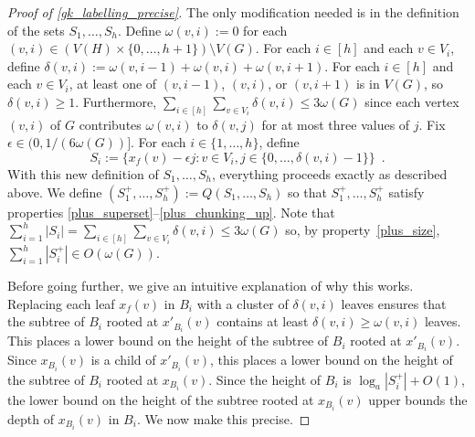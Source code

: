 \documentclass{patmorin}
\renewcommand{\ge}{\geqslant}
\renewcommand{\le}{\leqslant}
\newcommand{\Oh}{O}
\begin{document}
\begin{proof}[Proof of \cref{gk_labelling_precise}]
  The only modification needed is in the definition of the sets $S_1,\ldots,S_h$. Define $\omega(v,i):=0$ for each $(v,i)\in (V(H)\times\{0,\ldots,h+1\})\setminus V(G)$.  For each $i\in[h]$ and each $v\in V_i$, define $\delta(v,i) := \omega(v,i-1)+\omega(v,i)+\omega(v,i+1)$.  For each $i\in[h]$ and each $v\in V_i$, at least one of $(v,i-1)$, $(v,i)$, or $(v,i+1)$ is in $V(G)$, so $\delta(v,i) \ge 1$. Furthermore, $\sum_{i\in[h]}\sum_{v\in V_i}\delta(v,i) \le 3\omega(G)$ since each vertex $(v,i)$ of $G$ contributes $\omega(v,i)$ to $\delta(v,j)$ for at most three values of $j$. Fix $\epsilon \in (0,1/(6\omega(G))]$. For each $i\in\{1,\ldots,h\}$, define 
  \[
     S_i := \{ x_f(v)-\epsilon j: v\in V_i, j\in\{0,\ldots,\delta(v,i)-1\}\} \enspace .
  \]
  With this new definition of $S_1,\ldots,S_h$, everything proceeds exactly as described above. We define $(S^+_1,\ldots,S^+_h):= Q(S_1,\ldots,S_h)$ so that $S^+_1,\ldots,S^+_h$ satisfy properties \ref{plus_superset}--\ref{plus_chunking_up}. Note that $\sum_{i=1}^h |S_i| = \sum_{i\in[h]}\sum_{v\in V_i}\delta(v,i) \le 3\omega(G)$ so, by property~\ref{plus_size}, $\sum_{i=1}^h |S^+_i| \in \Oh(\omega(G))$.

  Before going further, we give an intuitive explanation of why this works.
  Replacing each leaf $x_f(v)$ in $B_i$ with a cluster of $\delta(v,i)$ leaves ensures that the subtree of $B_i$ rooted at $x'_{B_i}(v)$ contains at least $\delta(v,i)\ge \omega(v,i)$ leaves.  This places a lower bound on the height of the subtree of $B_i$ rooted at $x'_{B_i}(v)$.  Since $x_{B_i}(v)$ is a child of $x'_{B_i}(v)$, this places a lower bound on the height of the subtree of $B_i$ rooted at $x_{B_i}(v)$.  Since the height of $B_i$ is $\log_a |S^+_i| + \Oh(1)$, the lower bound on the height of the subtree rooted at $x_{B_i}(v)$ upper bounds the depth of $x_{B_i}(v)$ in $B_i$.  We now make this precise.


\end{proof}
\end{document}
